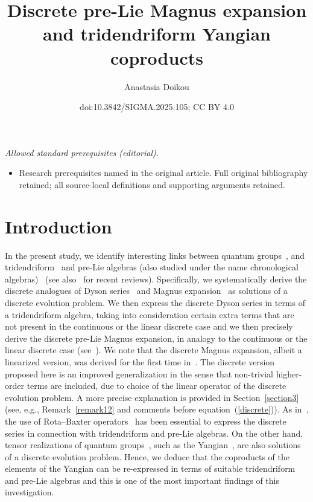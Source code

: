 \documentclass[10pt,a4paper]{amsart}
\title{Discrete pre-Lie Magnus expansion and tridendriform Yangian coproducts}
\author{Anastasia Doikou}
\date{doi:10.3842/SIGMA.2025.105; CC BY 4.0}
\numberwithin{equation}{section}
\theoremstyle{definition}
\begin{document}
\maketitle
\noindent\textit{Allowed standard prerequisites (editorial).}\begin{itemize}
\item Research prerequisites named in the original article. Full original bibliography retained; all source-local definitions and supporting arguments retained.
\end{itemize}\medskip
\section{Introduction}\label{section1}

In the present study, we identify interesting links between quantum groups~\cite{Drinfeld, Jimbo, FadTakRes}, and tridendriform~\cite{Dendri, Loday} and pre-Lie algebras (also studied under the name chronological algebras)~\mbox{\cite{Chrono, PreLie, Pre1}} (see also~\cite{Bai, Manchon} for recent reviews). Specifically, we systematically derive the discrete analogues of Dyson series~\cite{Dyson} and Magnus expansion~\cite{Magnus} as solutions of a discrete evolution problem. We then express the discrete Dyson series in terms of a tridendriform algebra, taking into consideration certain extra terms that are not present in the continuous or the linear discrete case and we then precisely derive the discrete pre-Lie Magnus expansion, in analogy to the continuous or the linear discrete case (see~\cite{EbraMan, new3, new4}). We note that the discrete Magnus expansion, albeit a linearized version, was derived for the first time in~\cite{EbraMan}. The discrete version proposed here is an improved generalization in the sense that non-trivial higher-order terms are included, due to choice of the linear operator of the discrete evolution problem. A more precise explanation is provided in Section~\ref{section3}
 (see, e.g., Remark~\ref{remark12} and comments before equation~(\ref{discrete})). As in~\cite{EbraMan}, the use of Rota--Baxter operators~\cite{Rota, Rota2, Rota3} has been essential to express the discrete series in connection with tridendriform and pre-Lie algebras. On the other hand, tensor realizations of quantum groups~\cite{ Drinfeld, Drinfeld1, Drinfeld2, FadTakRes}, such as the Yangian~\cite{Chari, Drinfeld, Drinfeld1, Drinfeld2, Molev}, are also solutions of a discrete evolution problem. Hence, we deduce that the coproducts of the elements of the Yangian can be re-expressed in terms of suitable tridendriform and pre-Lie algebras and this is one of the most important findings of this investigation.
\end{document}
